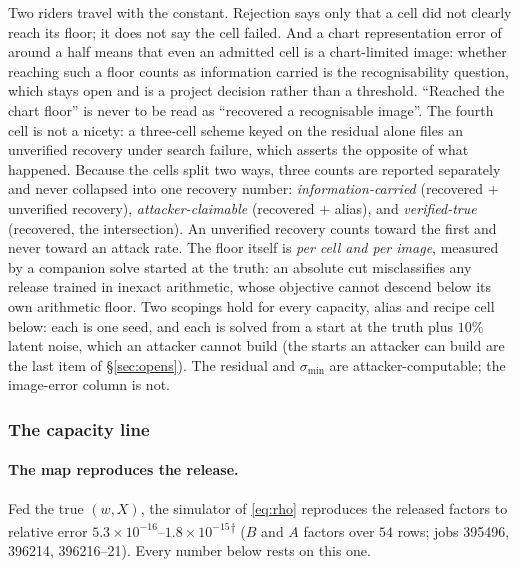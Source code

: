 Two riders travel with the constant. Rejection says only that a cell did not
clearly reach its floor; it does not say the cell failed. And a chart
representation error of around a half means that even an admitted cell is a
chart-limited image: whether reaching such a floor counts as information carried
is the recognisability question, which stays open and is a project decision
rather than a threshold. ``Reached the chart floor'' is never to be read as
``recovered a recognisable image''. The fourth cell is not a nicety: a
three-cell scheme keyed on the residual alone files an unverified recovery
under search failure, which asserts the opposite of what happened. Because the
cells split two ways, three counts are reported separately and never collapsed
into one recovery number: \emph{information-carried} (recovered $+$ unverified
recovery), \emph{attacker-claimable} (recovered $+$ alias), and
\emph{verified-true} (recovered, the intersection). An unverified recovery
counts toward the first and never toward an attack rate. The floor itself is
\emph{per cell and per image}, measured by a companion solve started at the
truth: an absolute cut misclassifies any release trained in inexact
arithmetic, whose objective cannot descend below its own arithmetic floor. Two scopings hold for every capacity, alias and
recipe cell below: each is one seed, and each is solved from a start at the
truth plus $10\%$ latent noise, which an attacker cannot build (the starts an
attacker can build are the last item of \S\ref{sec:opens}). The residual and
$\sigma_{\min}$ are attacker-computable; the image-error column is not.

\subsubsection*{The capacity line}

\paragraph{The map reproduces the release.} Fed the true $(w,X)$, the
simulator of \eqref{eq:rho} reproduces the released factors to relative error
$5.3\times10^{-16}$--$1.8\times10^{-15}$\textsuperscript{$\dagger$} ($B$ and $A$ factors over
$54$ rows; jobs 395496, 396214, 396216--21). Every number
below rests on this one.


